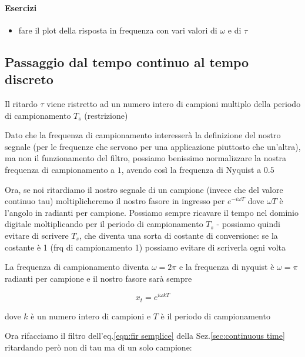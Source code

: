 \paragraph{Esercizi}

\begin{itemize}

	\item fare il plot della risposta in frequenza con vari valori di $\omega$ e
					di $\tau$

\end{itemize}


\subsection{Passaggio dal tempo continuo al tempo discreto}


	Il ritardo $\tau$ viene ristretto ad un numero intero di campioni multiplo della
		periodo di campionamento $T_s$ (restrizione)

	Dato che la frequenza di campionamento interesser\`a  la  definizione
    del  nostro  segnale  (per  le  frequenze  che   servono   per   una
    applicazione piuttosto che un'altra), ma non  il  funzionamento  del
    filtro, possiamo  benissimo  normalizzare  la  nostra  frequenza  di
    campionamento a $1$, avendo cos\`i la frequenza di Nyquist a $0.5$

	Ora, se noi ritardiamo il nostro segnale di un campione (invece che del
		valore continuo tau) moltiplicheremo il nostro fasore in ingresso per
		$e^{-i \omega T}$ dove $\omega T$ \`e l'angolo in radianti per campione. Possiamo sempre
		ricavare il tempo nel dominio digitale moltiplicando per il periodo di
		campionamento $T_s$ - possiamo quindi evitare di scrivere $T_s$, che diventa
		una sorta di costante di conversione: se la costante \`e 1 (frq di
		campionamento 1) possiamo evitare di scriverla ogni volta

	La frequenza di campionamento diventa $\omega = 2 \pi$ e la frequenza di nyquist \`e
		$\omega = \pi$ radianti per campione e il nostro fasore sar\`a sempre

		 \begin{equation}
	 			x_t = e^{i\omega kT}
		 \end{equation}
		
		dove $k$ \`e un numero intero di campioni e $T$ \`e il periodo di campionamento

		Ora rifacciamo il filtro dell'eq.\ref{eqn:fir semplice} della Sez.\vref{sec:continuous time} ritardando per\`o non di tau
	  ma di un solo campione:

